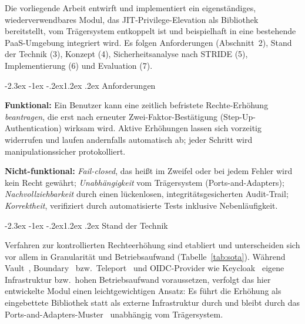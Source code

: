 \documentclass[11pt,a4paper]{article}
\makeatletter
\renewcommand\section{\@startsection{section}{1}{\z@}%
  {-2.3ex \@plus -1ex \@minus -.2ex}{1.2ex \@plus .2ex}%
  {\normalfont\Large\bfseries}}
\makeatother
\begin{document}
Die vorliegende Arbeit entwirft und implementiert ein eigenständiges,
wiederverwendbares Modul, das JIT-Privilege-Elevation als Bibliothek
bereitstellt, vom Trägersystem entkoppelt ist und beispielhaft in eine
bestehende PaaS-Umgebung integriert wird. Es folgen Anforderungen
(Abschnitt~2), Stand der Technik (3), Konzept (4), Sicherheitsanalyse nach
STRIDE (5), Implementierung (6) und Evaluation (7).

\section{Anforderungen}

\textbf{Funktional:} Ein Benutzer kann eine zeitlich befristete
Rechte-Erhöhung \emph{beantragen}, die erst nach erneuter
Zwei-Faktor-Bestätigung (Step-Up-Authentication) wirksam wird. Aktive
Erhöhungen lassen sich vorzeitig widerrufen und laufen andernfalls automatisch
ab; jeder Schritt wird manipulationssicher protokolliert.

\textbf{Nicht-funktional:} \emph{Fail-closed}, das heißt im Zweifel oder bei
jedem Fehler wird kein Recht gewährt; \emph{Unabhängigkeit} vom Trägersystem
(Ports-and-Adapters); \emph{Nachvollziehbarkeit} durch einen lückenlosen,
integritätsgesicherten Audit-Trail; \emph{Korrektheit}, verifiziert durch
automatisierte Tests inklusive Nebenläufigkeit.

\section{Stand der Technik}

Verfahren zur kontrollierten Rechteerhöhung sind etabliert und unterscheiden
sich vor allem in Granularität und Betriebsaufwand (Tabelle~\ref{tab:sota}).
Während Vault~\cite{vault}, Boundary~\cite{boundary} bzw.\
Teleport~\cite{teleport} und OIDC-Provider wie Keycloak~\cite{keycloak} eigene
Infrastruktur bzw.\ hohen Betriebsaufwand voraussetzen, verfolgt das hier
entwickelte Modul einen leichtgewichtigen Ansatz: Es führt die Erhöhung als
eingebettete Bibliothek statt als externe Infrastruktur durch und bleibt durch
das Ports-and-Adapters-Muster~\cite{hexagonal} unabhängig vom Trägersystem.
\end{document}
